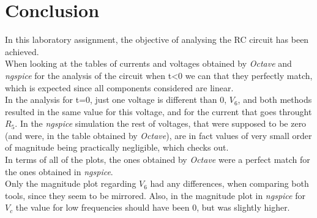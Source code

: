\section{Conclusion}
\label{sec:conclusion}
In this laboratory assignment, the objective of analysing the RC circuit has been achieved. \\
When looking at the tables of currents and voltages obtained by \textit{Octave} and \textit{ngspice} for the analysis of the circuit when t\textless 0 we can that they perfectly match, which is expected since all components considered are linear.\\
In the analysis for t=0, just one voltage is different than 0, $V_6$, and both methods resulted in the same value for this voltage, and for the current that goes throught $R_5$. In the \textit{ngspice} simulation the rest of voltages, that were supposed to be zero (and were, in the table obtained by \textit{Octave}), are in fact values of very small order of magnitude being practically negligible, which checks out.\\
In terms of all of the plots, the ones obtained by \textit{Octave} were a perfect match for the ones obtained in \textit{ngspice}.\\
Only the magnitude plot regarding $V_6$ had any differences, when comparing both tools, since they seem to be mirrored. Also, in the magnitude plot in \textit{ngspice} for $V_c$ the value for low frequencies should have been 0, but was slightly higher.
